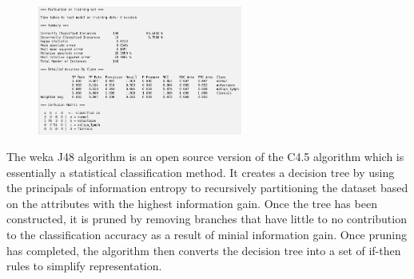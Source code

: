 \documentclass{article}
\begin{document}
\begin{enumerate}[label = (\alph*), left=10pt, itemsep=10pt]
\begin{minipage}[t]{0.9\textwidth}
\begin{figure}[H]
                \includegraphics[width=0.6\textwidth, height=0.3\textheight]{./6aiii1.png}                
            \end{figure}
            The weka J48 algorithm is an open source version of the C4.5 algorithm which is essentially a statistical
            classification method. It creates a decision tree by using the principals of information entropy to recursively
            partitioning the dataset based on the attributes with the highest information gain. Once the tree has been
            constructed, it is pruned by removing branches that have little to no contribution to the classification
            accuracy as a result of minial information gain. Once pruning has completed, the algorithm then converts
            the decision tree into a set of if-then rules to simplify representation.
        \end{minipage}


\end{enumerate}
\end{document}
